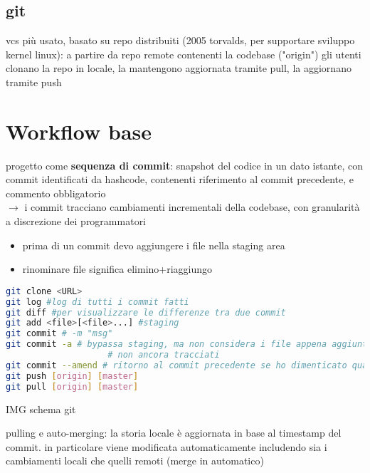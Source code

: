 \subsection{git}

vcs pi\`u usato, basato su repo distribuiti (2005 torvalds, per supportare sviluppo kernel linux): a partire da repo remote contenenti la codebase ("origin") gli utenti clonano la repo in locale, la mantengono aggiornata tramite pull, la aggiornano tramite push

\section{Workflow base}

progetto come \textbf{sequenza di commit}: snapshot del codice in un dato istante, con commit identificati da hashcode, contenenti riferimento al commit precedente, e commento obbligatorio\\
$\rightarrow$ i commit tracciano cambiamenti incrementali della codebase, con granularit\`a a discrezione dei programmatori

\begin{emphasize}
    \begin{itemize}
      \item prima di un commit devo aggiungere i file nella staging area
      \item rinominare file significa elimino+riaggiungo
    \end{itemize}
\end{emphasize}

\begin{lstlisting}[language=bash]
git clone <URL>
git log #log di tutti i commit fatti
git diff #per visualizzare le differenze tra due commit
git add <file>[<file>...] #staging
git commit # -m "msg"
git commit -a # bypassa staging, ma non considera i file appena aggiunti
			        # non ancora tracciati
git commit --amend # ritorno al commit precedente se ho dimenticato qualcosa
git push [origin] [master]
git pull [origin] [master]\end{lstlisting}

IMG schema git

\begin{emphasize}
    pulling e auto-merging: la storia locale \`e aggiornata in base al timestamp del commit. in particolare viene modificata automaticamente includendo sia i cambiamenti locali che quelli remoti (merge in automatico)
\end{emphasize}

